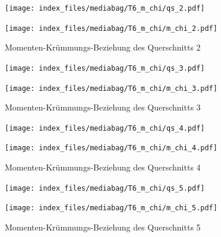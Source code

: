\documentclass[
  11pt,
  letterpaper,
]{scrreprt}
\begin{document}
\begin{figure}[H]

\begin{minipage}{0.50\linewidth}
\texttt{[image: index\_files/mediabag/T6\_m\_chi/qs\_2.pdf]}\end{minipage}%
%
\begin{minipage}{0.50\linewidth}
\texttt{[image: index\_files/mediabag/T6\_m\_chi/m\_chi\_2.pdf]}\end{minipage}%

\caption{\label{fig-mchi_anhang}Momenten-Krümmungs-Beziehung des
Querschnitts 2}

\end{figure}%

\begin{figure}[H]

\begin{minipage}{0.50\linewidth}
\texttt{[image: index\_files/mediabag/T6\_m\_chi/qs\_3.pdf]}\end{minipage}%
%
\begin{minipage}{0.50\linewidth}
\texttt{[image: index\_files/mediabag/T6\_m\_chi/m\_chi\_3.pdf]}\end{minipage}%

\caption{\label{fig-mchi_anhang}Momenten-Krümmungs-Beziehung des
Querschnitts 3}

\end{figure}%

\begin{figure}[H]

\begin{minipage}{0.50\linewidth}
\texttt{[image: index\_files/mediabag/T6\_m\_chi/qs\_4.pdf]}\end{minipage}%
%
\begin{minipage}{0.50\linewidth}
\texttt{[image: index\_files/mediabag/T6\_m\_chi/m\_chi\_4.pdf]}\end{minipage}%

\caption{\label{fig-mchi_anhang}Momenten-Krümmungs-Beziehung des
Querschnitts 4}

\end{figure}%

\begin{figure}[H]

\begin{minipage}{0.50\linewidth}
\texttt{[image: index\_files/mediabag/T6\_m\_chi/qs\_5.pdf]}\end{minipage}%
%
\begin{minipage}{0.50\linewidth}
\texttt{[image: index\_files/mediabag/T6\_m\_chi/m\_chi\_5.pdf]}\end{minipage}%

\caption{\label{fig-mchi_anhang}Momenten-Krümmungs-Beziehung des
Querschnitts 5}

\end{figure}%
\end{document}
